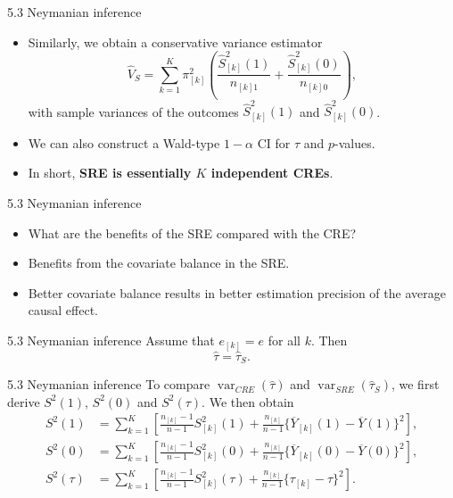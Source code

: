 \documentclass[aspectratio=169, 12pt]{beamer}
\begin{document}
\begin{frame}{5.3 Neymanian inference}
  \begin{itemize}
    \item Similarly, we obtain a conservative variance estimator
    \[
    \widehat{V}_S = \sum_{k=1}^{K}\pi_{[k]}^2\left(\frac{\widehat{S}_{[k]}^2(1)}{n_{[k]1}} + \frac{\widehat{S}_{[k]}^2(0)}{n_{[k]0}}\right),
    \]
    with sample variances of the outcomes $\widehat{S}_{[k]}^2(1)$ and $\widehat{S}_{[k]}^2(0)$.
    \item We can also construct a Wald-type $1-\alpha$ CI for $\tau$ and $p$-values.
    \item In short, \textbf{SRE is essentially $K$ independent CREs}.
  \end{itemize}
\end{frame}

\begin{frame}{5.3 Neymanian inference}
  \begin{itemize}
    \item What are the benefits of the SRE compared with the CRE?
    \item Benefits from the covariate balance in the SRE.
    \item Better covariate balance results in better estimation precision of the average causal effect. 
  \end{itemize}
\end{frame}

\begin{frame}[label=neymanian]{5.3 Neymanian inference}
  Assume that $e_{[k]} = e$ for all $k$. Then
  \begin{equation}
    \widehat{\tau} = \widehat{\tau}_S.
    \label{eq:neymanian_inf}
  \end{equation}
  \vfill
  \hfill\hyperlink{pf-neymanian<1>}{}
\end{frame}

\begin{frame}[label=variances]{5.3 Neymanian inference}
  To compare $\operatorname{var}_{CRE}(\widehat{\tau})$ and $\operatorname{var}_{SRE}(\widehat{\tau}_S)$, we first derive $S^2(1)$, $S^2(0)$ and $S^2(\tau)$. We then obtain
  \[
  \begin{aligned}
    S^2(1)
    &=\sum_{k=1}^{K}\left[
      \frac{n_{[k]}-1}{n-1}S_{[k]}^2(1)+\frac{n_{[k]}}{n-1}\{\overline{Y}_{[k]}(1)-\overline{Y}(1)\}^2
    \right],\\
    S^2(0)
    &=\sum_{k=1}^{K}\left[
      \frac{n_{[k]}-1}{n-1}S_{[k]}^2(0)+\frac{n_{[k]}}{n-1}\{\overline{Y}_{[k]}(0)-\overline{Y}(0)\}^2
    \right],\\
    S^2(\tau)
    &= \sum_{k=1}^{K}\left[
      \frac{n_{[k]}-1}{n-1}S_{[k]}^2(\tau) + \frac{n_{[k]}}{n-1}\{\tau_{[k]}-\tau\}^2
    \right].
  \end{aligned}
  \]
  \vfill
  \hfill\hyperlink{pf-variances<1>}{}
\end{frame}
\end{document}
